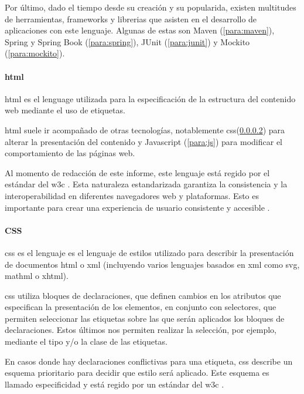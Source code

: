 Por último, dado el tiempo desde su creación y su popularida, existen multitudes de herramientas, frameworks y librerias que asisten en el desarrollo de aplicaciones con este lenguaje. Algunas de estas son Maven (\cref{para:maven}), Spring y Spring Book (\cref{para:spring}), JUnit (\cref{para:junit}) y Mockito (\cref{para:mockito}).

\paragraph{\acrshort{html}}\label{para:html}
\acrfull{html} es el lenguage utilizada para la especificación de la estructura del contenido web mediante el uso de etiquetas.

\acrshort{html} suele ir acompañado de otras tecnologías, notablemente \acrshort{css}(\cref{para:css}) para alterar la presentación del contenido y Javascript (\cref{para:js}) para modificar el comportamiento de las páginas web.

Al momento de redacción de este informe, este lenguaje está regido por el estándar del \acrfull{w3c} \cite{w3cHTML}. Esta naturaleza estandarizada garantiza la consistencia y la interoperabilidad en diferentes navegadores web y plataformas. Esto es importante para crear una experiencia de usuario consistente y accesible \cite{duckettHTMLCSS}.

\paragraph{CSS}\label{para:css}
\acrfull{css} es el lenguaje es el lenguaje de estilos utilizado para describir la presentación de documentos \acrshort{html} o \acrfull{xml} (incluyendo varios lenguajes basados en \acrshort{xml} como \acrfull{svg}, \acrshort{mathml} o \acrshort{xhtml}).

\acrshort{css} utiliza bloques de declaraciones, que definen cambios en los atributos que especifican la presentación de los elementos, en conjunto con selectores, que permiten seleccionar las etiquetas sobre las que serán aplicados los bloques de declaraciones. Estos últimos nos permiten realizar la selección, por ejemplo, mediante el tipo y/o la clase de las etiquetas.

En casos donde hay declaraciones conflictivas para una etiqueta, \acrshort{css} describe un esquema prioritario para decidir que estilo será aplicado. Este esquema es llamado especificidad y está regido por un estándar del \acrshort{w3c} \cite{w3cCSS}.

